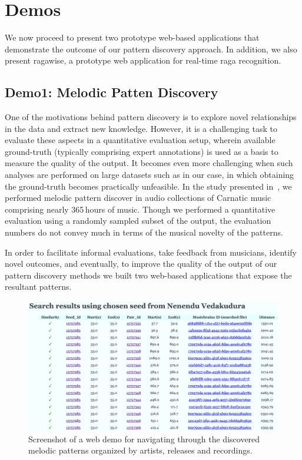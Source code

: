 \section{Demos}
\label{sec:demos}

We now proceed to present two prototype web-based applications that demonstrate the outcome of our pattern discovery approach. In addition, we also present \gls{ragawise}, a prototype web application for real-time \gls{raga} recognition. 

\subsection*{Demo1: Melodic Patten Discovery}

One of the motivations behind pattern discovery is to explore novel relationships in the data and extract new knowledge. However, it is a challenging task to evaluate these aspects  in a quantitative evaluation setup, wherein available ground-truth (typically comprising expert annotations) is used as a basis to measure the quality of the output. It becomes even more challenging when such analyses are performed on large datasets such as in our case, in which obtaining the ground-truth becomes practically unfeasible.  In the study presented in~\secref{}, we performed melodic pattern discover in audio collections of Carnatic music comprising nearly 365\,hours of music. Though we performed a quantitative evaluation using a randomly sampled subset of the output, the evaluation numbers do not convey much in terms of the musical novelty of the patterns. 

In order to facilitate informal evaluations, take feedback from musicians, identify novel outcomes, and eventually, to improve the quality of the output of our pattern discovery methods we built two web-based applications that expose the resultant patterns. 

\begin{figure}
	\begin{center}
		\includegraphics[width=\figSizeHundred]{ch08_applications/figures/patternBrowsing1.png}
	\end{center}
	\caption[A web demo for navigating through the discovered melodic patterns]{Screenshot of a web demo for navigating through the discovered melodic patterns organized by artists, releases and recordings.}
	\label{fig:browser_patterns}
\end{figure}

